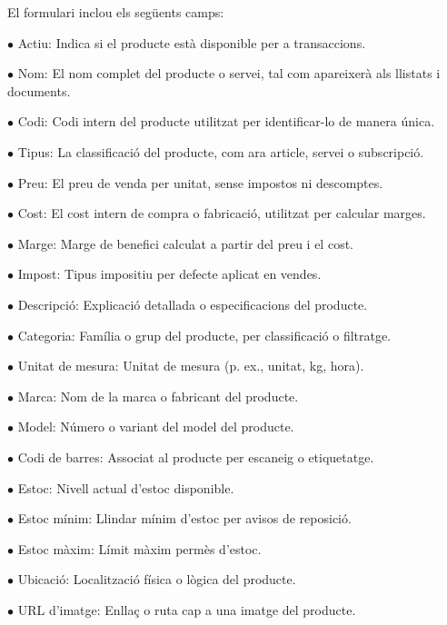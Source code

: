 \documentclass[a4paper]{article}
\begin{document}
El formulari inclou els següents camps:

\begin{compactitem}
\item[\color{myblue}$\bullet$] Actiu: Indica si el producte està disponible per a transaccions.
\item[\color{myblue}$\bullet$] Nom: El nom complet del producte o servei, tal com apareixerà als llistats i documents.
\item[\color{myblue}$\bullet$] Codi: Codi intern del producte utilitzat per identificar-lo de manera única.
\item[\color{myblue}$\bullet$] Tipus: La classificació del producte, com ara article, servei o subscripció.
\item[\color{myblue}$\bullet$] Preu: El preu de venda per unitat, sense impostos ni descomptes.
\item[\color{myblue}$\bullet$] Cost: El cost intern de compra o fabricació, utilitzat per calcular marges.
\item[\color{myblue}$\bullet$] Marge: Marge de benefici calculat a partir del preu i el cost.
\item[\color{myblue}$\bullet$] Impost: Tipus impositiu per defecte aplicat en vendes.
\item[\color{myblue}$\bullet$] Descripció: Explicació detallada o especificacions del producte.
\item[\color{myblue}$\bullet$] Categoria: Família o grup del producte, per classificació o filtratge.
\item[\color{myblue}$\bullet$] Unitat de mesura: Unitat de mesura (p. ex., unitat, kg, hora).
\item[\color{myblue}$\bullet$] Marca: Nom de la marca o fabricant del producte.
\item[\color{myblue}$\bullet$] Model: Número o variant del model del producte.
\item[\color{myblue}$\bullet$] Codi de barres: Associat al producte per escaneig o etiquetatge.
\item[\color{myblue}$\bullet$] Estoc: Nivell actual d'estoc disponible.
\item[\color{myblue}$\bullet$] Estoc mínim: Llindar mínim d'estoc per avisos de reposició.
\item[\color{myblue}$\bullet$] Estoc màxim: Límit màxim permès d'estoc.
\item[\color{myblue}$\bullet$] Ubicació: Localització física o lògica del producte.
\item[\color{myblue}$\bullet$] URL d'imatge: Enllaç o ruta cap a una imatge del producte.
\end{compactitem}
\end{document}
